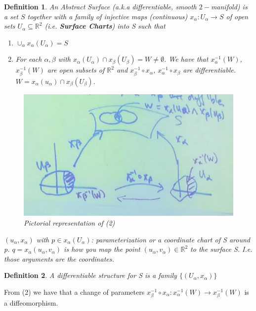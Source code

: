 \documentclass[a4paper, 11pt]{article}
\newtheorem*{definition}{Definition}
\begin{document}
	\begin{definition}
		An \textit{Abstract Surface} (a.k.a differentiable, smooth $2-$manifold) is a set $S$ together with a family of injective maps (continuous) $x_\alpha:U_\alpha \to S$ of open sets $U_\alpha \subseteq \mathbb{R}^2$  (i.e. \textbf{Surface Charts}) into S such that 
			\begin{enumerate}
				\item $\cup_\alpha x_\alpha(U_\alpha) = S$ \\
				\item For each $\alpha, \beta$ with $x_\alpha(U_\alpha)\cap x_\beta(U_\beta) = W \neq \emptyset$. We have that $x_\alpha^{-1}(W)$, $x_\beta^{-1}(W)$ are open subsets of $\mathbb{R}^2$ and $x_\beta^{-1}\circ x_\alpha$, $x_\alpha^{-1}\circ x_\beta$ are differentiable. $W = x_\alpha(u_\alpha)\cap x_\beta(U_\beta)$. 
			\end{enumerate}
		\begin{figure}[!hbt]
			\centering
			\includegraphics[width=0.65\columnwidth]{abstractDefinition}
			\caption{Pictorial representation of (2)}
		\end{figure}
		
		\noindent $(u_\alpha, x_\alpha)$ with $p\in x_\alpha(U_\alpha)$: parameterization or a coordinate chart of S around p. $q = x_\alpha(u_\alpha, v_\alpha)$ is how you map the point $(u_\alpha, v_\alpha)\in \mathbb{R}^2$ to the surface S. I.e. those arguments are the coordinates.\\ 
	
	\end{definition}
	
	
	\begin{definition}
		A \textit{differentiable structure} for S is a family $\{(U_\alpha, x_\alpha)\}$
	\end{definition}
	
	
	
	\noindent From (2) we have that a change of parameters $x_\beta^{-1}\circ x_\alpha : x_\alpha^{-1}(W)\to x_\beta^{-1}(W)$ is a diffeomorphism. \\
	
\end{document}
